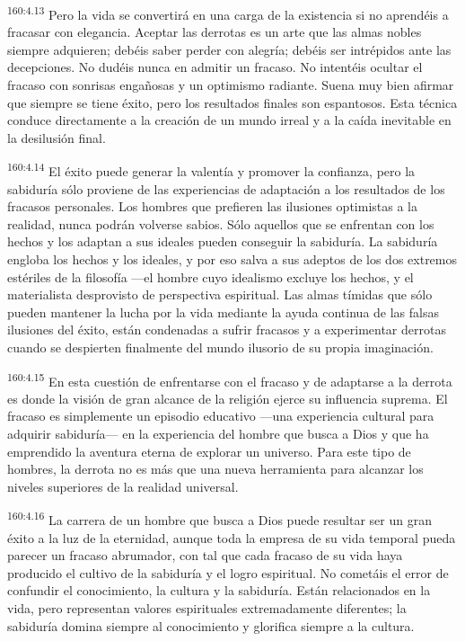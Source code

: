 \par 
\textsuperscript{160:4.13} Pero la vida se convertirá en una carga de la existencia si no aprendéis a fracasar con elegancia. Aceptar las derrotas es un arte que las almas nobles siempre adquieren; debéis saber perder con alegría; debéis ser intrépidos ante las decepciones. No dudéis nunca en admitir un fracaso. No intentéis ocultar el fracaso con sonrisas engañosas y un optimismo radiante. Suena muy bien afirmar que siempre se tiene éxito, pero los resultados finales son espantosos. Esta técnica conduce directamente a la creación de un mundo irreal y a la caída inevitable en la desilusión final.

\par 
\textsuperscript{160:4.14} El éxito puede generar la valentía y promover la confianza, pero la sabiduría sólo proviene de las experiencias de adaptación a los resultados de los fracasos personales. Los hombres que prefieren las ilusiones optimistas a la realidad, nunca podrán volverse sabios. Sólo aquellos que se enfrentan con los hechos y los adaptan a sus ideales pueden conseguir la sabiduría. La sabiduría engloba los hechos y los ideales, y por eso salva a sus adeptos de los dos extremos estériles de la filosofía ---el hombre cuyo idealismo excluye los hechos, y el materialista desprovisto de perspectiva espiritual. Las almas tímidas que sólo pueden mantener la lucha por la vida mediante la ayuda continua de las falsas ilusiones del éxito, están condenadas a sufrir fracasos y a experimentar derrotas cuando se despierten finalmente del mundo ilusorio de su propia imaginación.

\par 
\textsuperscript{160:4.15} En esta cuestión de enfrentarse con el fracaso y de adaptarse a la derrota es donde la visión de gran alcance de la religión ejerce su influencia suprema. El fracaso es simplemente un episodio educativo ---una experiencia cultural para adquirir sabiduría--- en la experiencia del hombre que busca a Dios y que ha emprendido la aventura eterna de explorar un universo. Para este tipo de hombres, la derrota no es más que una nueva herramienta para alcanzar los niveles superiores de la realidad universal.

\par 
\textsuperscript{160:4.16} La carrera de un hombre que busca a Dios puede resultar ser un gran éxito a la luz de la eternidad, aunque toda la empresa de su vida temporal pueda parecer un fracaso abrumador, con tal que cada fracaso de su vida haya producido el cultivo de la sabiduría y el logro espiritual. No cometáis el error de confundir el conocimiento, la cultura y la sabiduría. Están relacionados en la vida, pero representan valores espirituales extremadamente diferentes; la sabiduría domina siempre al conocimiento y glorifica siempre a la cultura.

